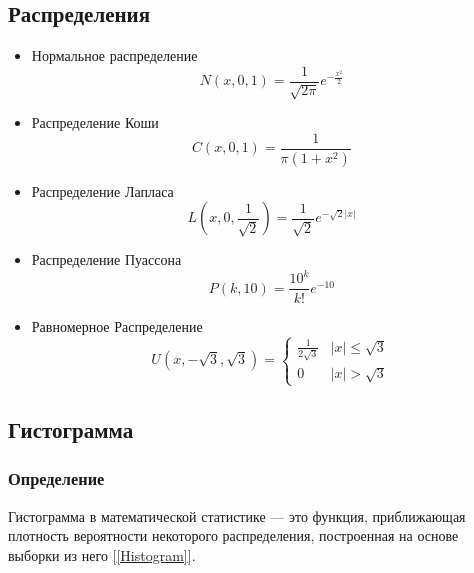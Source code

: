 \documentclass[12pt,a4paper]{article}
\begin{document}
	\subsection{Распределения}
	\begin{itemize}
		\item Нормальное распределение \begin{equation}\label{eqn:normal}
		N(x,0,1) = \frac{1}{\sqrt{2\pi}}e^{-\frac{x^2}{2}}
		\end{equation}
		
		\item Распределение Коши
		\begin{equation}\label{eqn:cauchy}
		C(x,0,1) = \frac{1}{\pi(1+x^2)}
		\end{equation}
		
		\item Распределение Лапласа
		\begin{equation}\label{eqn:laplace}
		L\left( x,0,\frac{1}{\sqrt{2}}\right) = \frac{1}{\sqrt{2}}e^{-\sqrt{2}\vert x\vert}
		\end{equation}
		
		\item Распределение Пуассона
		\begin{equation}\label{eqn:poisson}
		P(k,10) = \frac{10^k}{k!}e^{-10}
		\end{equation}
		
		\item Равномерное Распределение
		\begin{equation}\label{eqn:uniform}
		U(x,-\sqrt{3}, \sqrt{3}) = 
		\begin{cases}
		\frac{1}{2\sqrt{3}} &\vert x\vert \leqslant \sqrt{3}\\
		0 &\vert x\vert > \sqrt{3}
		\end{cases}
		\end{equation}
	\end{itemize}

	\subsection{Гистограмма}
		\subsubsection{Определение}
			Гистограмма в математической статистике --- это функция, приближающая
			плотность вероятности некоторого распределения, построенная на основе
			выборки из него [\ref{Histogram}].
\end{document}
